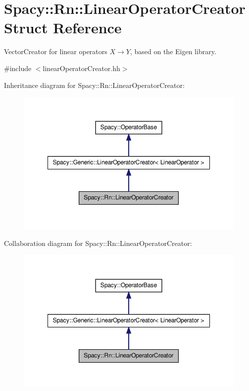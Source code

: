 \hypertarget{structSpacy_1_1Rn_1_1LinearOperatorCreator}{\section{\-Spacy\-:\-:\-Rn\-:\-:\-Linear\-Operator\-Creator \-Struct \-Reference}
\label{structSpacy_1_1Rn_1_1LinearOperatorCreator}
}


\-Vector\-Creator for linear operators $X\rightarrow Y$, based on the \-Eigen library.  




{\ttfamily \#include $<$linear\-Operator\-Creator.\-hh$>$}



\-Inheritance diagram for \-Spacy\-:\-:\-Rn\-:\-:\-Linear\-Operator\-Creator\-:
\nopagebreak
\begin{figure}[H]
\begin{center}
\leavevmode
\includegraphics[width=348pt]{structSpacy_1_1Rn_1_1LinearOperatorCreator__inherit__graph}
\end{center}
\end{figure}


\-Collaboration diagram for \-Spacy\-:\-:\-Rn\-:\-:\-Linear\-Operator\-Creator\-:
\nopagebreak
\begin{figure}[H]
\begin{center}
\leavevmode
\includegraphics[width=348pt]{structSpacy_1_1Rn_1_1LinearOperatorCreator__coll__graph}
\end{center}
\end{figure}
